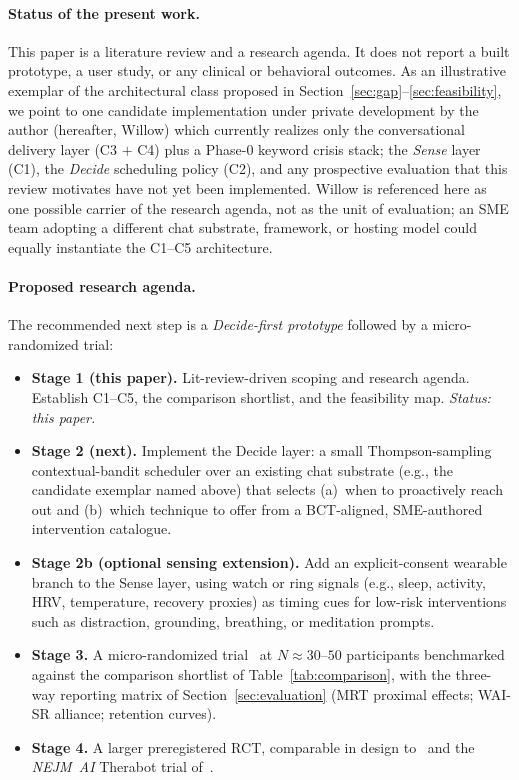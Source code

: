 \documentclass[11pt,a4paper]{article}
\newcommand{\secref}[1]{Section~\ref{#1}}
\newcommand{\tabref}[1]{Table~\ref{#1}}
\begin{document}
\paragraph{Status of the present work.}
This paper is a literature review and a research agenda. It does
not report a built prototype, a user study, or any clinical or
behavioral outcomes. As an illustrative exemplar of the
architectural class proposed in
\secref{sec:gap}--\ref{sec:feasibility}, we point to one candidate
implementation under private development by the author (hereafter,
Willow) which currently
realizes only the conversational delivery layer (C3 $+$ C4) plus
a Phase-0 keyword crisis stack; the \emph{Sense} layer (C1), the
\emph{Decide} scheduling policy (C2), and any prospective
evaluation that this review motivates have not yet been
implemented. Willow is referenced here as one possible carrier of
the research agenda, not as the unit of evaluation; an SME team
adopting a different chat substrate, framework, or hosting model
could equally instantiate the C1--C5 architecture.

\paragraph{Proposed research agenda.}
The recommended next step is a \emph{Decide-first prototype}
followed by a micro-randomized trial:

\begin{itemize}\setlength{\itemsep}{0pt}
  \item \textbf{Stage 1 (this paper).} Lit-review-driven scoping
    and research agenda. Establish C1--C5, the comparison
    shortlist, and the feasibility map. \emph{Status: this paper.}
  \item \textbf{Stage 2 (next).} Implement the Decide layer: a
    small Thompson-sampling contextual-bandit scheduler over an
    existing chat substrate (e.g., the candidate exemplar named
    above) that selects (a)~when to proactively reach out and
    (b)~which technique to offer from a BCT-aligned, SME-authored
    intervention catalogue.
  \item \textbf{Stage 2b (optional sensing extension).} Add an
    explicit-consent wearable branch to the Sense layer, using
    watch or ring signals (e.g., sleep, activity, HRV,
    temperature, recovery proxies) as timing cues for low-risk
    interventions such as distraction, grounding, breathing, or
    meditation prompts.
  \item \textbf{Stage 3.} A micro-randomized
    trial~\cite{Klasnja2015MRT,Liao2016MRTSampleSize,Seewald2019MRTData}
    at $N\!\approx\!30\text{--}50$ participants benchmarked
    against the comparison shortlist of \tabref{tab:comparison},
    with the three-way reporting matrix of
    \secref{sec:evaluation} (MRT proximal effects; WAI-SR
    alliance; retention curves).
  \item \textbf{Stage 4.} A larger preregistered RCT, comparable
    in design to~\cite{Aguilera2024DIAMANTERL} and the
    \textit{NEJM~AI} Therabot trial of~\cite{Heinz2025TherabotRCT}.
\end{itemize}
\end{document}
